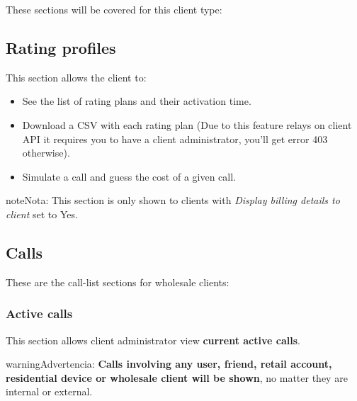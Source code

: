 \documentclass[letterpaper,10pt,spanish]{sphinxmanual}
\begin{document}
These sections will be covered for this client type:


\subsection{Rating profiles}
\label{administration_portal/client/wholesale/rating_profiles:rating-profiles}\label{administration_portal/client/wholesale/rating_profiles::doc}
This section allows the client to:
\begin{itemize}
\item {} 
See the list of rating plans and their activation time.

\item {} 
Download a CSV with each rating plan (Due to this feature relays on client API it requires you to have a client administrator, you'll get error 403 otherwise).

\item {} 
Simulate a call and guess the cost of a given call.

\end{itemize}

\begin{notice}{note}{Nota:}
This section is only shown to clients with \emph{Display billing details to client} set to Yes.
\end{notice}


\subsection{Calls}
\label{administration_portal/client/wholesale/calls/index::doc}\label{administration_portal/client/wholesale/calls/index:calls}
These are the call-list sections for wholesale clients:


\subsubsection{Active calls}
\label{administration_portal/client/wholesale/calls/active_calls::doc}\label{administration_portal/client/wholesale/calls/active_calls:active-calls}
This section allows client administrator view \textbf{current active calls}.

\begin{notice}{warning}{Advertencia:}
\textbf{Calls involving any user, friend, retail account, residential device or wholesale client will be shown},
no matter they are internal or external.
\end{notice}
\end{document}
